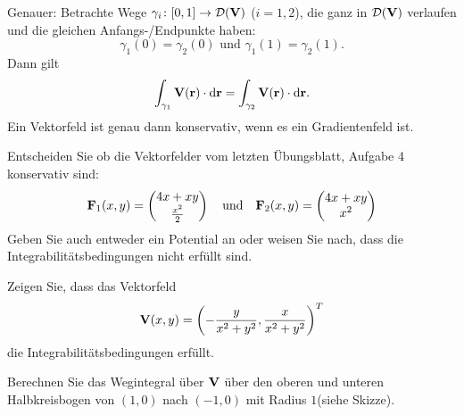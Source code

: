 \documentclass{scrartcl}
\newcommand{\DD}{\mathcal{D}}
\begin{document}
Genauer: Betrachte Wege $\gamma_i\colon [0,1] \to \DD(\mat V)$ ($i=1,2$), die ganz in $\DD(\mat V)$ verlaufen und die gleichen Anfangs-/Endpunkte haben: 
\[
  \gamma_1(0) = \gamma_2(0) \mbox{ und } \gamma_1(1) = \gamma_2(1).
\]
Dann gilt
\[
  \int_{\gamma_1} \mathbf{V}(\mathbf{r}) \cdot \mathrm{d} \mathbf{r} = \int_{\gamma_2} \mathbf{V}(\mathbf{r}) \cdot \mathrm{d} \mathbf{r}.
\]
Ein Vektorfeld ist genau dann konservativ, wenn es ein Gradientenfeld ist.
\begin{subex}
  \item{} Entscheiden Sie ob die Vektorfelder vom letzten Übungsblatt, Aufgabe 4 konservativ sind:
  \[
    \mathbf{F}_1(x, y) = \begin{pmatrix}4x + xy \\ \frac{x^2}{2}\end{pmatrix} \quad \mbox{und} \quad \mathbf{F}_2 (x, y) = \begin{pmatrix}4x + xy \\ x^2\end{pmatrix}
  \]
  Geben Sie auch entweder ein Potential an oder weisen Sie nach, dass die Integrabilitätsbedingungen nicht erfüllt sind.
  \item{} Zeigen Sie, dass das Vektorfeld
  \[
    \mathbf{V}(x,y) = \left(- \frac{y}{x^2 + y^2}, \frac{x}{x^2 + y^2} \right)^T
  \]
  die Integrabilitätsbedingungen erfüllt.
  \item{} Berechnen Sie das Wegintegral über $\mathbf{V}$ über den oberen und unteren Halbkreisbogen von $(1,0)$ nach $(-1,0)$ mit Radius $1$(siehe Skizze).
\end{subex}
\begin{center}
\end{center}
\end{document}

